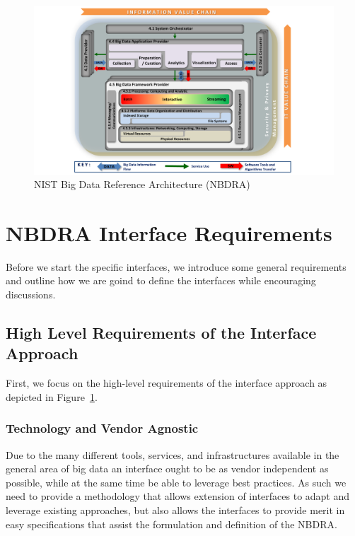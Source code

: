 \documentclass[10pt]{article}
\begin{document}
\begin{figure}[h]\centering
\includegraphics[width=1.1\textwidth]{images/vol8-diagrams}
\caption{NIST Big Data Reference Architecture (NBDRA)}
\label{F:architecture}
\end{figure}


\section{NBDRA Interface Requirements}

Before we start the specific interfaces, we introduce some general
requirements and outline how we are goind to define the interfaces
while encouraging discussions.

\subsection{High Level Requirements of the Interface Approach}

First, we focus on the high-level requirements of the interface
approach as depicted in Figure~\ref{F:architecture}.

\subsubsection{Technology and Vendor Agnostic}

Due to the many different tools, services, and infrastructures
available in the general area of big data an interface ought to be as
vendor independent as possible, while at the same time be able to
leverage best practices. As such we need to provide a methodology that
allows extension of interfaces to adapt and leverage existing
approaches, but also allows the interfaces to provide merit in easy
specifications that assist the formulation and definition of the
NBDRA.
\end{document}
